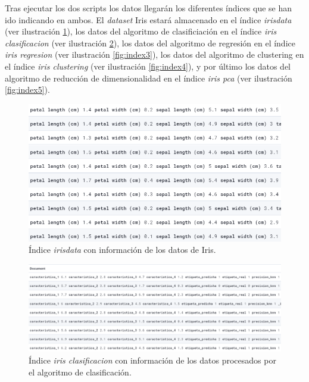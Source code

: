 Tras ejecutar los dos scripts los datos llegarán los diferentes índices que se han ido indicando en ambos. El \textit{dataset} Iris estará almacenado en el índice \textit{irisdata}  (ver ilustración  \ref{fig:index1}), los datos del algoritmo de clasificiación en el índice \textit{iris clasificacion}  (ver ilustración  \ref{fig:index2}), los datos del algoritmo de regresión en el índice \textit{iris regresion}  (ver ilustración  \ref{fig:index3}), los datos del algoritmo de clustering en el índice \textit{iris clustering}  (ver ilustración  \ref{fig:index4}),  y por último los datos del algoritmo de reducción de dimensionalidad en el índice \textit{iris pca}  (ver ilustración  \ref{fig:index5}).

\begin{figure}
    \centering
    \includegraphics[width=1\linewidth]{img/iris13.png}
    \caption{Índice \textit{irisdata} con información de los datos de Iris.}
    \label{fig:index1}
\end{figure}


\begin{figure}
    \centering
    \includegraphics[width=1\linewidth]{img/iris14.png}
    \caption{Índice \textit{iris clasificacion} con información de los datos procesados por el algoritmo de clasificación.}
    \label{fig:index2}
\end{figure}


